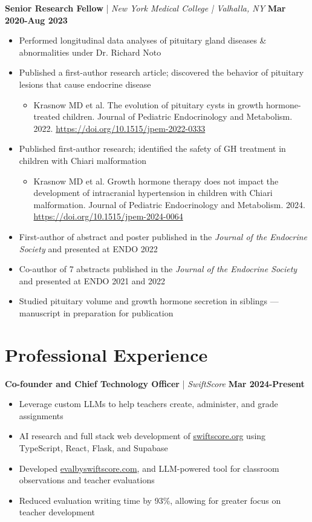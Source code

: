 \documentclass[letterpaper,10.5pt]{article}
\begin{document}
\noindent\textbf{Senior Research Fellow} | \textit{New York Medical College | Valhalla, NY} \hfill \textbf{Mar 2020-Aug 2023}
\begin{itemize}
  \item Performed longitudinal data analyses of pituitary gland diseases \& abnormalities under Dr. Richard Noto
  \item Published a first-author research article; discovered the behavior of pituitary lesions that cause endocrine disease
  \begin{itemize}[label=o]
    \item Krasnow MD et al. The evolution of pituitary cysts in growth hormone-treated children. Journal of Pediatric Endocrinology and Metabolism. 2022. \href{https://doi.org/10.1515/jpem-2022-0333}{https://doi.org/10.1515/jpem-2022-0333}
  \end{itemize}
  \item Published first-author research; identified the safety of GH treatment in children with Chiari malformation
  \begin{itemize}[label=o]
    \item Krasnow MD et al. Growth hormone therapy does not impact the development of intracranial hypertension in children with Chiari malformation. Journal of Pediatric Endocrinology and Metabolism. 2024. \href{https://doi.org/10.1515/jpem-2024-0064}{https://doi.org/10.1515/jpem-2024-0064}
  \end{itemize}
  \item First-author of abstract and poster published in the \textit{Journal of the Endocrine Society} and presented at ENDO 2022
  \item Co-author of 7 abstracts published in the \textit{Journal of the Endocrine Society} and presented at ENDO 2021 and 2022
  \item Studied pituitary volume and growth hormone secretion in siblings — manuscript in preparation for publication
\end{itemize}

\section{Professional Experience}

\noindent\textbf{Co-founder and Chief Technology Officer} | \textit{SwiftScore} \hfill \textbf{Mar 2024-Present}
\begin{itemize}
  \item Leverage custom LLMs to help teachers create, administer, and grade assignments
  \item AI research and full stack web development of \href{http://swiftscore.org}{swiftscore.org} using TypeScript, React, Flask, and Supabase
  \item Developed \href{https://evalbyswiftscore.com}{evalbyswiftscore.com}, and LLM-powered tool for classroom observations and teacher evaluations
  \item Reduced evaluation writing time by 93\%, allowing for greater focus on teacher development
\end{itemize}
\end{document}

